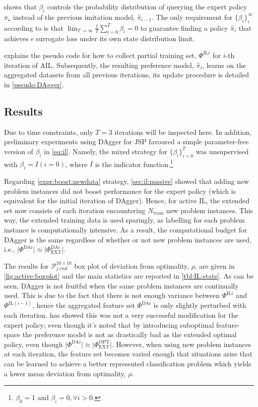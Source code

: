 \documentclass[twocolumn]{svjour3}
\newcommand{\abs}[1]{\lvert#1\rvert}
\newcommand{\limit}[3]{\lim_{#2}#1=#3}
\newcommand{\namerho}{deviation from optimality, $\rho$}
\newcommand{\Problem}[2][ ]{$\mathcal{P}_{#2}^{#1}$}
\newcommand{\jrnd}[2]{\Problem[#1 \times #2]{j.rnd}}
\begin{document}
 shows that $\beta_i$ controls the probability distribution of 
querying the expert policy $\pi_\star$ instead of the previous imitation model, 
$\hat{\pi}_{i-1}$. 
The only requirement for $\{\beta_i\}_i^\infty$ according to \cite{RossGB11} is 
that $\limit{\frac{1}{T}\sum_{i=0}^T\beta_i}{T\to\infty}{0}$ to guarantee 
finding a policy $\hat{\pi}_i$ that achieves $\epsilon$ surrogate loss under 
its own state distribution limit.

 explains the pseudo code for how to collect 
partial training set, $\Phi^{\text{IL}i}$ for $i$-th iteration of AIL.
Subsequently, the resulting preference model, $\hat{\pi}_i$, learns on the 
aggregated datasets from all previous iterations, its update procedure is 
detailed in \cref{pseudo:DAgger}.




\subsection{Results}\label{sec:ail:expr}
Due to time constraints, only $T=3$ iterations will be inspected here.
In addition, preliminary experiments using DAgger for JSP favoured a 
simple parameter-free version of $\beta_i$ in \cref{eq:il}. 
Namely, the mixed strategy for $\{\beta_i\}_{i=0}^T$ was unsupervised 
with $\beta_i=I(i=0)$, where $I$ is the indicator 
function.\footnote{$\beta_0=1$ and $\beta_i=0,\forall i>0$.}

Regarding \ref{expr:boost:newdata} strategy, \cref{sec:il:passive} showed that 
adding new problem instances did not boost performance for the expert policy 
(which is equivalent for the initial iteration of DAgger). 
Hence, for active IL, the extended set now consists of each iteration 
encountering $N_{\text{train}}$ new problem instances.
This way, the extended training data is used sparingly, as labelling for each 
problem instance is computationally intensive. As a result, the computational 
budget for DAgger is the same regardless of whether or not new problem 
instances are used, i.e., 
$\abs{\Phi^{\text{DA}i}}\approx\abs{\Phi^{\text{DA}i}_{\text{EXT}}}$.

The results for \jrnd{10}{10} box plot of \namerho, are given in 
\cref{fig:active:boxplot} and the main statistics are reported in 
\cref{tbl:IL:stats}. As can be seen, DAgger is not fruitful when the same 
problem instances are continually used. This is due to the fact that there is 
not enough variance between $\Phi^{\text{IL}i}$ and $\Phi^{\text{IL}(i-1)}$, 
hence the aggregated feature set $\Phi^{\text{DA}i}$ is only slightly perturbed 
with each iteration.  has showed this was not a 
very successful modification for the expert policy; even though it's noted that 
by introducing suboptimal feature-space the preference model is not as 
drastically bad as the extended optimal policy, even though 
$\abs{\Phi^{\text{DA}i}}\approx\abs{\Phi^{\text{OPT}}_{\text{EXT}}}$.
However, when using new problem instances at each iteration, the feature set 
becomes varied enough that situations arise that can be learned to achieve a 
better represented classification problem which yields a lower mean \namerho.
\end{document}
